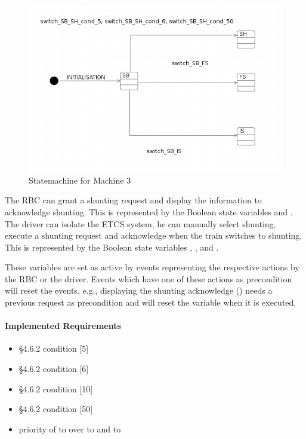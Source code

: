 \documentclass{template/openetcs_article}
\begin{document}
\begin{figure}[ht]
  \centering
  \includegraphics[width=.75\textwidth]{statechart4}
  \caption{Statemachine for Machine 3}
  \label{fig:statemachine-m3}
\end{figure}



The RBC can grant a shunting request and display the information to acknowledge
shunting. This is represented by the Boolean state variables
 and . The driver can
isolate the ETCS system, he can manually select shunting, execute a shunting
request and acknowledge when the train switches to shunting. This is represented
by the Boolean state variables ,
,  and
.


These variables are set as active by events representing the respective actions
by the RBC or the driver. Events which have one of these actions as precondition
will reset the events, e.g., displaying the shunting acknowledge
() needs a previous request as precondition and
will reset the variable  when it is executed.

\paragraph{Implemented Requirements}
\label{sec:impl-requ-1}

\begin{itemize}
\item §4.6.2 condition [5]
\item §4.6.2 condition [6]
\item §4.6.2 condition [10]
\item §4.6.2 condition [50]
\item priority of  to  over  to  and
   to 
\end{itemize}
\end{document}
